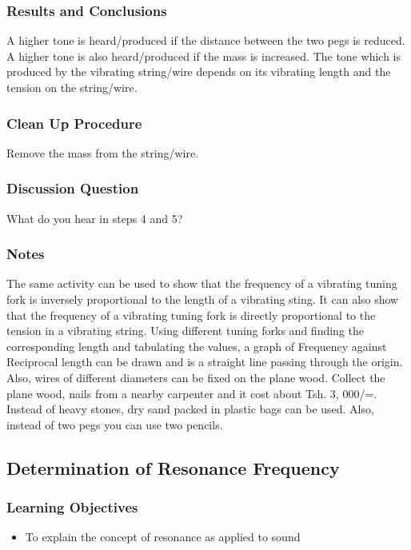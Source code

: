 \subsubsection*{Results and Conclusions}
A higher tone is heard/produced if the distance between the two pegs is reduced. A higher tone is also heard/produced if the mass is increased.  
The tone which is produced by the vibrating string/wire depends on its vibrating length and the tension on the string/wire.

\subsubsection*{Clean Up Procedure}
Remove the mass from the string/wire.

\subsubsection*{Discussion Question}
What do you hear in steps 4 and 5?

\subsubsection*{Notes}
The same activity can be used to show that the frequency of a vibrating tuning fork is inversely proportional to the length of a vibrating sting. It can also show that the frequency of a vibrating tuning fork is directly proportional to the tension in a vibrating string. Using different tuning forks and finding the corresponding length and tabulating the values, a graph of Frequency against Reciprocal length can be drawn and is a straight line passing through the origin. Also, wires of different diameters can be fixed on the plane wood. Collect the plane wood, nails from a nearby carpenter and it cost about Tsh.  3, 000/=. Instead of heavy stones, dry sand packed in plastic bags can be used. Also, instead of two pegs you can use two pencils.  
	
	
	
\subsection{Determination of Resonance Frequency}

\subsubsection*{Learning Objectives}
\begin{itemize}
\item{To explain the concept of resonance as applied to sound} 
\end{itemize}

